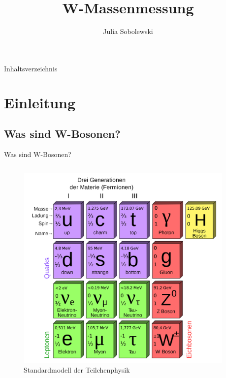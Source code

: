 \documentclass[aspectratio=1610, 9pt]{beamer}
\title{W-Massenmessung}
\author[Julia ~Sobolewski]{Julia Sobolewski}
\institute[Fakultät Physik]{Fakultät Physik}
\begin{document}
\maketitle

\begin{frame}{Inhaltsverzeichnis}
  \tableofcontents
\end{frame}

\section{Einleitung}

\subsection{Was sind W-Bosonen?}

\begin{frame}{Was sind W-Bosonen?}
  \begin{columns}
    \begin{column}{0.4\textwidth}
      \begin{figure}
        \includegraphics[width=\textwidth]{images/standard_model.png}
        \caption{Standardmodell der Teilchenphysik \cite{standard_model}}
      \end{figure}
    \end{column}
    \begin{column}{0.4\textwidth}

\end{column}
\end{columns}
\end{frame}
\end{document}
